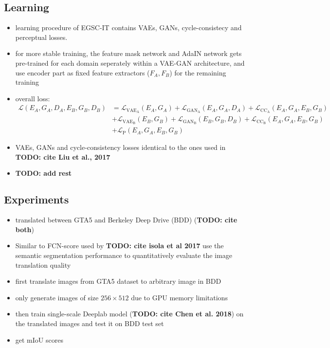 \documentclass[]{article}
\newcommand{\todo}[1]{{\color{red}\bf{TODO: #1}}}
\begin{document}
\subsection{Learning}
\begin{itemize}
	\item learning procedure of EGSC-IT contains VAEs, GANs, cycle-consistecy and perceptual losses.
	\item for more stable training, the feature mask network and AdaIN network gets pre-trained for each domain seperately within a VAE-GAN architecture, and use encoder part as fixed feature extractors ($F_A, F_B$) for the remaining training
	\item overall loss: 
	\begin{align}
	\mathcal{L}(E_A, G_A, D_A, E_B, G_B, D_B) &= \mathcal{L}_{\text{VAE}_\text{A}}(E_A, G_A) + \mathcal{L}_{\text{GAN}_{\text{A}}}(E_A,G_A,D_A) + \mathcal{L}_{\text{CC}_{\text{A}}}(E_A, G_A, E_B, G_B)\\
	&+  \mathcal{L}_{\text{VAE}_\text{B}}(E_B, G_B) + \mathcal{L}_{\text{GAN}_{\text{B}}}(E_B,G_B,D_B) + \mathcal{L}_{\text{CC}_{\text{B}}}(E_A, G_A, E_B, G_B)\\
	&+ \mathcal{L}_{\text{P}}(E_A, G_A, E_B, G_B)
	\end{align}
	\item VAEs, GANs and cycle-consistency losses identical to the ones used in \todo{cite Liu et al., 2017}
	\item \todo{add rest}
\end{itemize}

\subsection{Experiments}
\begin{itemize}
	\item translated between GTA5 and Berkeley Deep Drive (BDD) (\todo{cite both})
	\item Similar to FCN-score used by \todo{cite isola et al 2017} use the semantic segmentation performance to quantitatively evaluate the image translation quality
	\item first translate images from GTA5 dataset to arbitrary image in BDD
	\item only generate images of size $256 \times 512$ due to GPU memory limitations
	\item then train single-scale Deeplab model (\todo{cite Chen et al. 2018}) on the translated images and test it on BDD test set
	\item get mIoU scores
\end{itemize}
\end{document}
